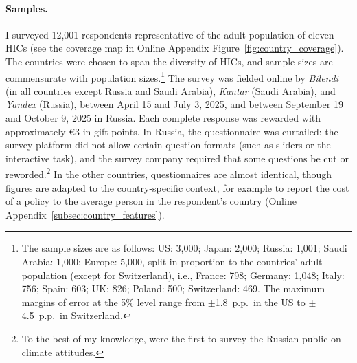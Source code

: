 \documentclass[12pt,english]{article}
\begin{document}
\paragraph{Samples.} I surveyed 12,001 respondents representative of the adult population of eleven HICs (see the coverage map in Online Appendix Figure~\ref{fig:country_coverage}). The countries were chosen to span the diversity of HICs, and sample sizes are commensurate with population sizes.\footnote{The sample sizes are as follows: US: 3,000; Japan: 2,000; Russia: 1,001; Saudi Arabia: 1,000; Europe: 5,000, split in proportion to the countries' adult population (except for Switzerland), i.e., France: 798; Germany: 1,048; Italy: 756; Spain: 603; UK: 826; Poland: 500; Switzerland: 469. The maximum margins of error at the 5\% level range from $\pm$1.8~p.p.\ in the US to $\pm$4.5~p.p.\ in Switzerland.} The survey was fielded online by \textit{Bilendi} (in all countries except Russia and Saudi Arabia), \textit{Kantar} (Saudi Arabia), and \textit{Yandex} (Russia), between April 15 and July 3, 2025, and between September 19 and October 9, 2025 in Russia. Each complete response was rewarded with approximately \euro{}3 in gift points. In Russia, the questionnaire was curtailed: the survey platform did not allow certain question formats (such as sliders or the interactive task), and the survey company required that some questions be cut or reworded.\footnote{To the best of my knowledge, \cite{toews_learning_2025} were the first to survey the Russian public on climate attitudes.} In the other countries, questionnaires are almost identical, though figures are adapted to the country-specific context, for example to report the cost of a policy to the average person in the respondent's country (Online Appendix~\ref{subsec:country_features}).
\end{document}
